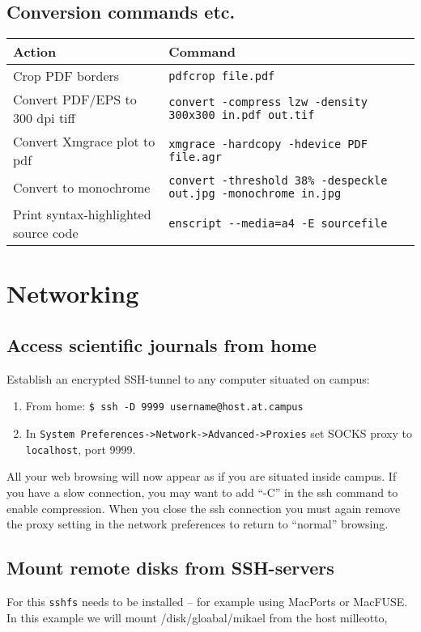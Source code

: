 \documentclass[a4paper,10pt]{article}
\begin{document}
\subsection{Conversion commands etc.}
\begin{table}[h!]
\center
\begin{tabular}{ll}\hline\hline
Action              & Command \\\hline
Crop PDF borders & \verb"pdfcrop file.pdf" \\
Convert PDF/EPS to 300 dpi tiff & \verb"convert -compress lzw -density 300x300 in.pdf out.tif" \\
Convert Xmgrace plot to pdf     & \verb"xmgrace -hardcopy -hdevice PDF file.agr"\\
Convert to monochrome           & \verb"convert -threshold 38% -despeckle out.jpg -monochrome in.jpg"\\
Print syntax-highlighted source code & \verb"enscript --media=a4 -E sourcefile"\\\hline
\end{tabular}\end{table}



\section{Networking}
\subsection{Access scientific journals from home}
Establish an encrypted SSH-tunnel to any computer situated on campus:
\begin{enumerate}
\item From home: \verb+$ ssh -D 9999 username@host.at.campus+
\item In \verb+System Preferences->Network->Advanced->Proxies+ set SOCKS proxy to \verb+localhost+, port 9999.
\end{enumerate}
All your web browsing will now appear as if you are situated inside campus. If you have a slow connection, you may want to add ``-C'' in the ssh command to enable compression.  When you close the ssh connection you must again remove the proxy setting in the network preferences to return to ``normal'' browsing.

\subsection{Mount remote disks from SSH-servers}
For this \verb+sshfs+ needs to be installed -- for example using MacPorts or MacFUSE. In this example we will mount /disk/gloabal/mikael from the host milleotto,\\
\end{document}
